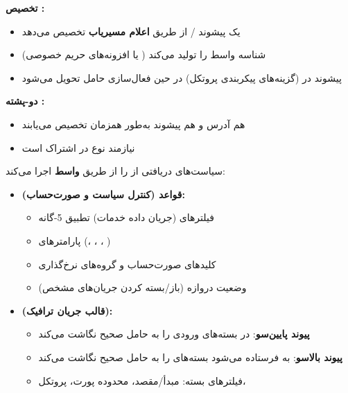 \textbf{تخصیص :}

\begin{itemize}
\tightlist
\item
   یک پیشوند /\allowbreak{} از طریق \textbf{اعلام مسیریاب } تخصیص می‌دهد
\item
   شناسه واسط را تولید می‌کند ( یا افزونه‌های حریم خصوصی)
\item
  پیشوند در  (گزینه‌های پیکربندی پروتکل) در حین فعال‌سازی حامل تحویل می‌شود
\end{itemize}

\textbf{دو-پشته :}

\begin{itemize}
\tightlist
\item
  هم آدرس  و هم پیشوند  به‌طور همزمان تخصیص می‌یابند
\item
  نیازمند نوع  در اشتراک است
\end{itemize}


 سیاست‌های دریافتی از  را از طریق \textbf{واسط } اجرا می‌کند:

\begin{itemize}
\tightlist
\item
  \textbf{قواعد  (کنترل سیاست و صورت‌حساب):}

  \begin{itemize}
  \tightlist
  \item
    فیلترهای  (جریان داده خدمات)  تطبیق 5-گانه
  \item
    پارامترهای  (، ، ، )
  \item
    کلیدهای صورت‌حساب و گروه‌های نرخ‌گذاری
  \item
    وضعیت دروازه (باز/\allowbreak{}بسته کردن جریان‌های مشخص)
  \end{itemize}
\item
  \textbf{ (قالب جریان ترافیک):}

  \begin{itemize}
  \tightlist
  \item
    \textbf{ پیوند پایین‌سو}: در   بسته‌های  ورودی را به حامل صحیح نگاشت می‌کند
  \item
    \textbf{ پیوند بالاسو}: به  فرستاده می‌شود   بسته‌های  را به حامل صحیح نگاشت می‌کند
  \item
    فیلترهای بسته:  مبدأ/\allowbreak{}مقصد، محدوده پورت، پروتکل، 
  \end{itemize}
\end{itemize}

